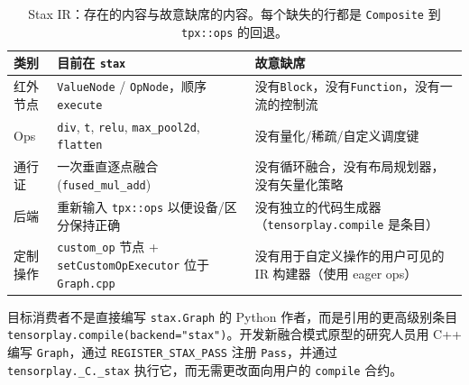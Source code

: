 \begin{table}[H]
\centering
\caption{Stax IR：存在的内容与故意缺席的内容。每个缺失的行都是 \texttt{Composite} 到 \texttt{tpx::ops} 的回退。}
\label{tab:staxscope}
\small
\begin{tabular}{p{3.6cm}p{4.4cm}p{3.8cm}}
\toprule
类别 & 目前在 \texttt{stax} & 故意缺席 \\
\midrule
红外节点 & \texttt{ValueNode} / \texttt{OpNode}，顺序 \texttt{execute} & 没有\texttt{Block}，没有\texttt{Function}，没有一流的控制流 \\
Ops & \texttt{div}, \texttt{t}, \texttt{relu}, \texttt{max\_pool2d}, \texttt{flatten} & 没有量化/稀疏/自定义调度键 \\
通行证 & 一次垂直逐点融合 (\texttt{fused\_mul\_add}) & 没有循环融合，没有布局规划器，没有矢量化策略 \\
后端 & 重新输入 \texttt{tpx::ops} 以便设备/区分保持正确 & 没有独立的代码生成器（\texttt{tensorplay.compile} 是条目） \\
定制操作 & \texttt{custom\_op} 节点 + \texttt{setCustomOpExecutor} 位于 \texttt{Graph.cpp} & 没有用于自定义操作的用户可见的 IR 构建器（使用 eager ops） \\
\bottomrule
\end{tabular}
\end{table}

目标消费者不是直接编写 \texttt{stax.Graph} 的 Python 作者，而是引用的更高级别条目 \texttt{tensorplay.compile(backend="stax")}。开发新融合模式原型的研究人员用 C++ 编写 \texttt{Graph}，通过 \texttt{REGISTER\_STAX\_PASS} 注册 \texttt{Pass}，并通过 \texttt{tensorplay.\_C.\_stax} 执行它，而无需更改面向用户的 \texttt{compile} 合约。


